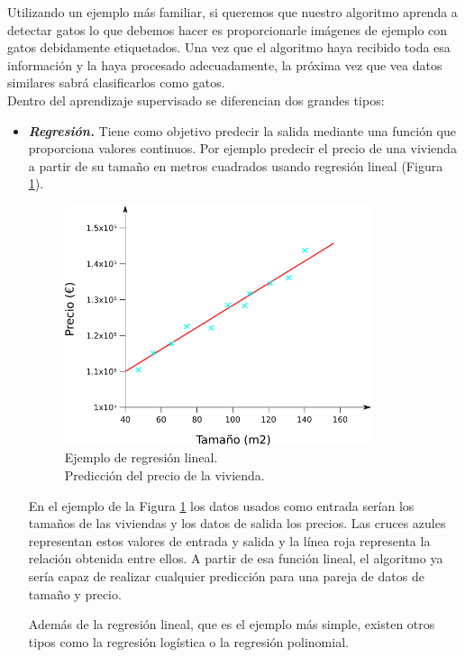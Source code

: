 Utilizando un ejemplo más familiar, si queremos que nuestro algoritmo aprenda a detectar gatos lo que debemos hacer es proporcionarle imágenes de ejemplo con gatos debidamente etiquetados. Una vez que el algoritmo haya recibido toda esa información y la haya procesado adecuadamente, la próxima vez que vea datos similares sabrá clasificarlos como gatos.\\

\noindent Dentro del aprendizaje supervisado se diferencian dos grandes tipos:
\begin{itemize}
\item \textit{\textbf{Regresión.}} Tiene como objetivo predecir la salida mediante una función que proporciona valores continuos. Por ejemplo predecir el precio de una vivienda a partir de su tamaño en metros cuadrados usando regresión lineal (Figura \ref{fig:ejemplo_regresion}).

\begin{figure} [h!]
  \begin{center}
    \includegraphics[width=9cm]{figs/ejemplo_regresion.png}
  \end{center}
  \caption{Ejemplo de regresión lineal.\\
  Predicción del precio de la vivienda.}
  \label{fig:ejemplo_regresion}
\end{figure}

En el ejemplo de la Figura \ref{fig:ejemplo_regresion} los datos usados como entrada serían los tamaños de las viviendas y los datos de salida los precios. Las cruces azules representan estos valores de entrada y salida y la línea roja representa la relación obtenida entre ellos. A partir de esa función lineal, el algoritmo ya sería capaz de realizar cualquier predicción para una pareja de datos de tamaño y precio.

Además de la regresión lineal, que es el ejemplo más simple, existen otros tipos como la regresión logística o la regresión polinomial.


\end{itemize}
